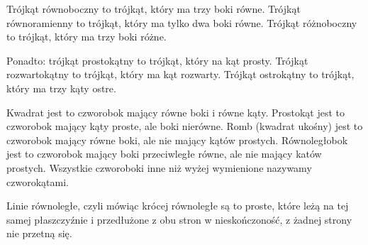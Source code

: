 \begin{euclid_definition}
    Trójkąt równoboczny to trójkąt, który ma trzy boki równe. Trójkąt równoramienny to trójkąt, który ma tylko dwa boki równe. Trójkąt różnoboczny to trójkąt, który ma trzy boki różne.
\end{euclid_definition}

\begin{euclid_definition}
    Ponadto: trójkąt prostokątny to trójkąt, który na kąt prosty. Trójkąt rozwartokątny to trójkąt, który ma kąt rozwarty. Trójkąt ostrokątny to trójkąt, który ma trzy kąty ostre.
\end{euclid_definition}

\begin{euclid_definition}
    Kwadrat jest to czworobok mający równe boki i równe kąty. Prostokąt jest to czworobok mający kąty proste, ale boki nierówne. Romb (kwadrat ukośny) jest to czworobok mający równe boki, ale nie mający kątów prostych. Równoległobok jest to czworobok mający boki przeciwległe równe, ale nie mający katów prostych. Wszystkie czworoboki inne niż wyżej wymienione nazywamy czworokątami.
\end{euclid_definition}

\begin{euclid_definition}
    Linie równoległe, czyli mówiąc krócej równoległe są to proste, które leżą na tej samej płaszczyźnie i przedłużone z obu stron w nieskończoność, z żadnej strony nie przetną się.
\end{euclid_definition}